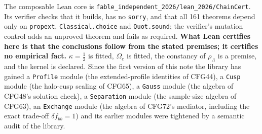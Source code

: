 \documentclass[10pt]{article}
\newcommand{\fpath}[1]{\nolinkurl{#1}}
\begin{document}
The composable Lean core is \fpath{fable_independent_2026/lean_2026/ChainCert}. Its verifier checks that it builds, has no \texttt{sorry}, and that all 161 theorems depend only on \texttt{propext}, \texttt{Classical.choice} and \texttt{Quot.sound}; the verifier's mutation control adds an unproved theorem and fails as required. \textbf{What Lean certifies here is that the conclusions follow from the stated premises; it certifies no empirical fact.} $\kappa=\tfrac12$ is fitted, $\Omega_c$ is fitted, the constancy of $\rho_\Lambda$ is a premise, and the kernel is declared. Since the first version of this note the library has gained a \texttt{Profile} module (the extended-profile identities of CFG44), a \texttt{Cusp} module (the halo-cusp scaling of CFG65), a \texttt{Gauss} module (the algebra of CFG48's solution check), a \texttt{Separation} module (the sample-size algebra of CFG63), an \texttt{Exchange} module (the algebra of CFG72's mediator, including the exact trade-off $\delta f_{bb}=1$) and its earlier modules were tightened by a semantic audit of the library.
\end{document}
